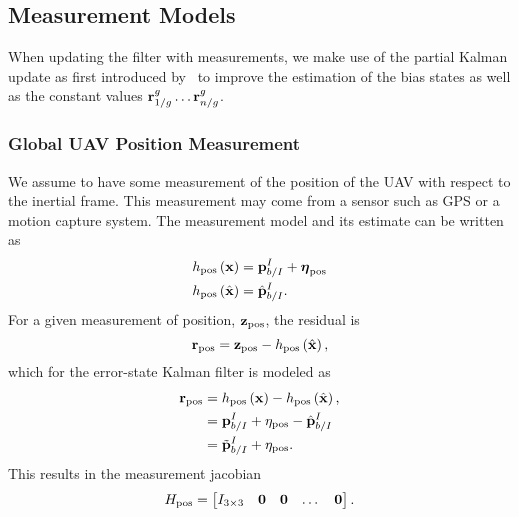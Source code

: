 
\subsection{Measurement Models}
\label{sec:measurement_models}

When
updating the filter with measurements, we make use of the partial Kalman update
as first introduced by~\cite{brink2017partial} to improve the estimation of the
bias states as well as the constant values $\vect{r}_{1/g}^{g} \dots
\vect{r}_{n/g}^{g}$.

\subsubsection{Global UAV Position Measurement}
We assume to have some measurement of the position of the UAV with respect to
the inertial
frame. This measurement may come from a sensor such as GPS or a motion capture system.
The measurement model and its estimate can
be written as
\begin{align}
  h_{\text{pos}} \left( \boldsymbol{\mathrm{x}} \right) &= \boldsymbol{\mathrm{p}}_{b/I}^I +
  \boldsymbol{\mathrm{\eta}}_{\text{pos}} \\
  h_{\text{pos}} \left( \hat{\boldsymbol{\mathrm{x}}} \right) &= \hat{\boldsymbol{\mathrm{p}}}_{b/I}^I.
\end{align}
For a given measurement of position, $\boldsymbol{\mathrm{z}}_{\text{pos}}$, the residual is
\begin{equation*}
  \boldsymbol{\mathrm{r}}_{\text{pos}} = \boldsymbol{\mathrm{z}}_{\text{pos}} - h_{\text{pos}} \left( \hat{\boldsymbol{\mathrm{x}}}
  \right),
\end{equation*}
which for the error-state Kalman filter is modeled as
\begin{align*}
  \boldsymbol{\mathrm{r}}_{\text{pos}} &=  h_{\text{pos}} \left( \boldsymbol{\mathrm{x}} \right) - h_{\text{pos}} \left( \hat{\boldsymbol{\mathrm{x}}}
  \right), \\
                        &= \boldsymbol{\mathrm{p}}_{b/I}^I + \eta_{\text{pos}} -
                        \hat{\boldsymbol{\mathrm{p}}}_{b/I}^I \\
                        &= \tilde{\boldsymbol{\mathrm{p}}}_{b/I}^I + \eta_{\text{pos}}.
\end{align*}
This results in the measurement jacobian
\begin{equation*}
  H_{\text{pos}} =
  \begin{bmatrix}
    I_{3 \times 3} & \boldsymbol{\mathrm{0}} & \boldsymbol{\mathrm{0}} & \dots & \boldsymbol{\mathrm{0}}
  \end{bmatrix}.
\end{equation*}



